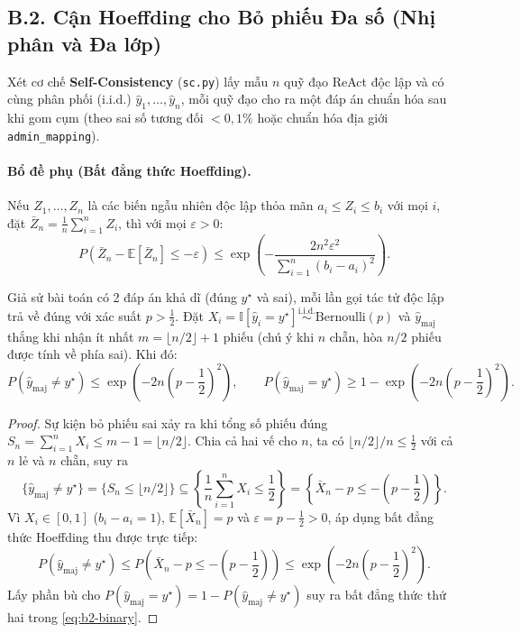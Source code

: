 \subsection{B.2. Cận Hoeffding cho Bỏ phiếu Đa số (Nhị phân và Đa lớp)}
\label{subsec:b2-hoeffding}

Xét cơ chế \textbf{Self-Consistency} (\texttt{sc.py}) lấy mẫu $n$ quỹ đạo ReAct độc lập và có cùng phân phối (i.i.d.) $\hat{y}_1, \dots, \hat{y}_n$, mỗi quỹ đạo cho ra một đáp án chuẩn hóa sau khi gom cụm (theo sai số tương đối $< 0{,}1\%$ hoặc chuẩn hóa địa giới \texttt{admin\_mapping}).

\paragraph{Bổ đề phụ (Bất đẳng thức Hoeffding).}
Nếu $Z_1, \dots, Z_n$ là các biến ngẫu nhiên độc lập thỏa mãn $a_i \le Z_i \le b_i$ với mọi $i$, đặt $\bar{Z}_n = \frac{1}{n}\sum_{i=1}^n Z_i$, thì với mọi $\varepsilon > 0$:
\[
  P(\bar{Z}_n - \mathbb{E}[\bar{Z}_n] \le -\varepsilon) \le \exp\!\left(-\frac{2n^2 \varepsilon^2}{\sum_{i=1}^n (b_i - a_i)^2}\right).
\]

\begin{theorem}
\label{thm:b2-binary}
Giả sử bài toán có 2 đáp án khả dĩ (đúng $y^\star$ và sai), mỗi lần gọi tác tử độc lập trả về đúng với xác suất $p > \tfrac{1}{2}$. Đặt $X_i = \mathbb{I}[\hat{y}_i = y^\star] \stackrel{\text{i.i.d.}}{\sim} \text{Bernoulli}(p)$ và $\hat{y}_{\text{maj}}$ thắng khi nhận ít nhất $m = \lfloor n/2 \rfloor + 1$ phiếu (chú ý khi $n$ chẵn, hòa $n/2$ phiếu được tính về phía sai). Khi đó:
\begin{equation}
  P(\hat{y}_{\text{maj}} \neq y^\star) \le \exp\!\left(-2n\left(p - \frac{1}{2}\right)^2\right), \qquad
  P(\hat{y}_{\text{maj}} = y^\star) \ge 1 - \exp\!\left(-2n\left(p - \frac{1}{2}\right)^2\right).
  \label{eq:b2-binary}
\end{equation}
\end{theorem}

\begin{proof}
Sự kiện bỏ phiếu sai xảy ra khi tổng số phiếu đúng $S_n = \sum_{i=1}^n X_i \le m - 1 = \lfloor n/2 \rfloor$. Chia cả hai vế cho $n$, ta có $\lfloor n/2 \rfloor / n \le \tfrac{1}{2}$ với cả $n$ lẻ và $n$ chẵn, suy ra
\[
  \{\hat{y}_{\text{maj}} \neq y^\star\} = \{S_n \le \lfloor n/2 \rfloor\} \subseteq \left\{\frac{1}{n} \sum_{i=1}^n X_i \le \frac{1}{2}\right\} = \left\{\bar{X}_n - p \le -\left(p - \frac{1}{2}\right)\right\}.
\]
Vì $X_i \in [0, 1]$ ($b_i - a_i = 1$), $\mathbb{E}[\bar{X}_n] = p$ và $\varepsilon = p - \tfrac{1}{2} > 0$, áp dụng bất đẳng thức Hoeffding thu được trực tiếp:
\[
  P(\hat{y}_{\text{maj}} \neq y^\star) \le P\!\left(\bar{X}_n - p \le -\left(p - \frac{1}{2}\right)\right) \le \exp\!\left(-2n\left(p - \frac{1}{2}\right)^2\right).
\]
Lấy phần bù cho $P(\hat{y}_{\text{maj}} = y^\star) = 1 - P(\hat{y}_{\text{maj}} \neq y^\star)$ suy ra bất đẳng thức thứ hai trong \eqref{eq:b2-binary}.
\end{proof}

